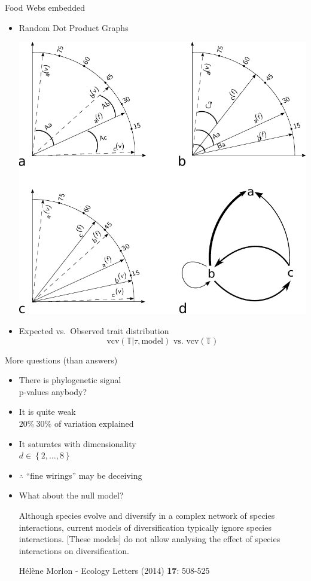 \documentclass[]{beamer}
\begin{document}
\begin{frame}{Food Webs embedded}

\begin{itemize}[<+->]
\centering
\item
Random Dot Product Graphs

  \includegraphics[width=0.6\linewidth]{images/RDPGmodel.pdf}

\item
Expected vs.~Observed trait distribution
  \begin{equation*}
    \textrm{vcv}\left( \mathbb{T} | \tau, \mbox{model} \right) \mbox{ vs. } \textrm{vcv}\left(\mathbb{T}\right)
  \end{equation*}

\end{itemize}

\end{frame}

\begin{frame}{More questions (than answers)}

\begin{itemize}[<+->]
\itemsep1pt\parskip0pt
\item
  There is phylogenetic signal\\
  {\tiny p-values anybody?}
\item
  It is quite weak\\
  {\tiny $20\% ~ 30\%$ of variation explained}
\item
  It saturates with dimensionality\\
  {\tiny $d \in \left\{2, \dots , 8 \right\}$}
\item
  $\therefore$ ``fine wirings'' may be deceiving
\item
What about the null model?

{\em
{\scriptsize Although species evolve and diversify in a complex network of species interactions, current models of diversification typically ignore species interactions. [These models] do not allow analysing the effect of species interactions on diversification.

H\'{e}l\`{e}ne Morlon - \textrm{Ecology Letters} (2014) \textbf{17}: 508-525}
}
\end{itemize}

\end{frame}
\end{document}
